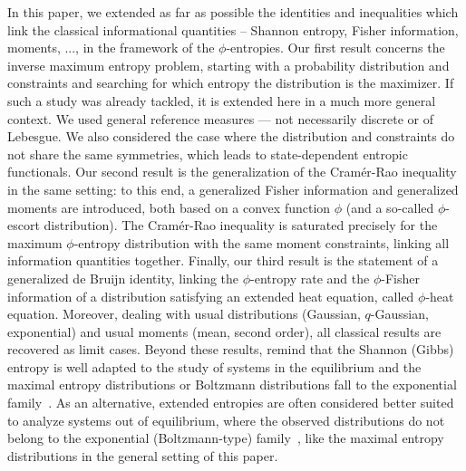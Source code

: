 \documentclass[entropy,article,submit,moreauthors,pdftex]{Definitions/mdpi}
\begin{document}
In this  paper, we extended as  far as possible the  identities and inequalities
which link  the classical  informational quantities  -- Shannon  entropy, Fisher
information, moments, ...,  in the framework of the  $\phi$-entropies. Our first
result concerns the inverse maximum entropy problem, starting with a probability
distribution and constraints and searching for which entropy the distribution is
the maximizer.  If  such a study was  already tackled, it is extended  here in a
much  more  general  context.   We  used  general  reference  measures  ---  not
necessarily discrete  or of  Lebesgue.  We  also considered  the case  where the
distribution and  constraints do not share  the same symmetries, which  leads to
state-dependent entropic  functionals.  Our second result  is the generalization
of the Cram\'er-Rao  inequality in the same setting: to  this end, a generalized
Fisher  information and  generalized moments  are  introduced, both  based on  a
convex  function  $\phi$  (and  a so-called  $\phi$-escort  distribution).   The
Cram\'er-Rao inequality  is saturated  precisely for the  maximum $\phi$-entropy
distribution  with   the  same  moment  constraints,   linking  all  information
quantities  together.   Finally,  our  third   result  is  the  statement  of  a
generalized  de  Bruijn  identity,  linking  the  $\phi$-entropy  rate  and  the
$\phi$-Fisher  information  of  a   distribution  satisfying  an  extended  heat
equation,   called  $\phi$-heat   equation.    Moreover,   dealing  with   usual
distributions  (Gaussian, $q$-Gaussian,  exponential) and  usual moments  (mean,
second order), all classical results are  recovered as limit cases. Beyond these
results, remind that the Shannon (Gibbs) entropy is well adapted to the study of
systems in  the equilibrium and  the maximal entropy distributions  or Boltzmann
distributions fall to the exponential family~\cite{CovTho06, BorLew91:05, Arn01,
  MezMon09}.  As an alternative, extended  entropies are often considered better
suited to analyze  systems out of equilibrium, where  the observed distributions
do not  belong to the exponential  (Boltzmann-type) family~\cite{Tsa88, TsaMen98,
  Tsa99, Tsa09, EssSch00,  ParBir05}, like the maximal  entropy distributions in
the general setting of this paper.
\end{document}
